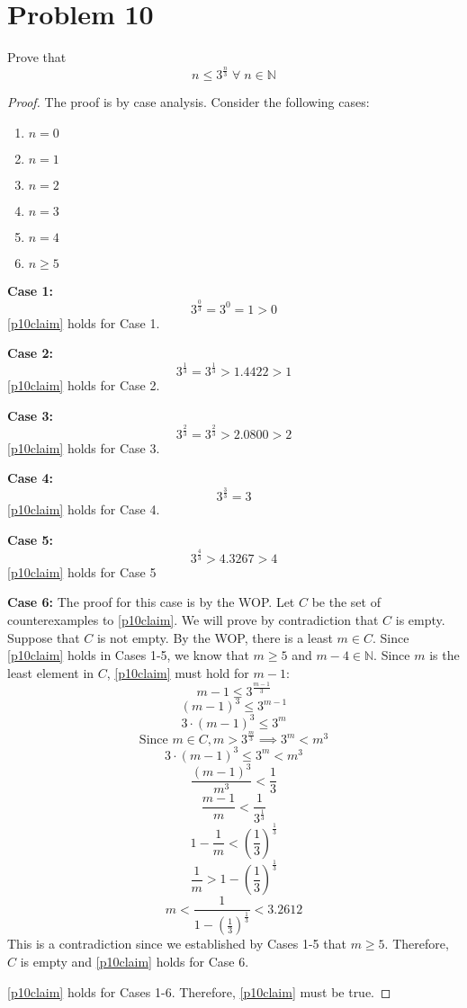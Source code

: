 \documentclass{article}
\begin{document}
\section{Problem 10}
Prove that
\begin{equation}\label{p10claim}
	n \leq 3^{\frac{n}{3}} \; \forall \; n \in \mathbb{N}
\end{equation}
\begin{proof}
	The proof is by case analysis. Consider the following cases:
	\begin{enumerate}
		\item $n = 0$
		\item $n = 1$
		\item $n = 2$
		\item $n = 3$
		\item $n = 4$
		\item $n \geq 5$
	\end{enumerate}

	\textbf{Case 1:}
	\[
		3^{\frac{0}{3}} = 3^0 = 1 > 0
	\]
	\eqref{p10claim} holds for Case 1.

	\textbf{Case 2:}
	\[
		3^{\frac{1}{3}} = 3^{\frac{1}{3}} > 1.4422 > 1
	\]
	\eqref{p10claim} holds for Case 2.

	\textbf{Case 3:}
	\[
		3^{\frac{2}{3}} = 3^{\frac{2}{3}} > 2.0800 > 2
	\]
	\eqref{p10claim} holds for Case 3.

	\textbf{Case 4:}
	\[
		3^{\frac{3}{3}} = 3
	\]
	\eqref{p10claim} holds for Case 4.

	\textbf{Case 5:}
	\[
		3^{\frac{4}{3}} > 4.3267 > 4
	\]
	\eqref{p10claim} holds for Case 5

	\textbf{Case 6:}
	The proof for this case is by the WOP. Let $C$ be the set of counterexamples to \eqref{p10claim}. We will prove by contradiction that $C$ is empty. Suppose that $C$ is not empty. By the WOP, there is a least $m \in C$. Since \eqref{p10claim} holds in Cases 1-5, we know that $m \geq 5$ and $m - 4 \in \mathbb{N}$. Since $m$ is the least element in $C$, \eqref{p10claim} must hold for $m - 1$:
	\[
		m - 1 \leq 3^{\frac{m - 1}{3}}
	\]
	\[
		(m - 1)^3 \leq 3^{m-1}
	\]
	\[
		3 \cdot (m - 1)^3 \leq 3^m
	\]
	\[
		\text{Since } m \in C, m > 3^{\frac{m}{3}} \implies 3^m < m^3
	\]
	\[
		3 \cdot (m - 1)^3 \leq 3^m < m^3
	\]
	\[
		\frac{(m - 1)^3}{m^3} < \frac{1}{3}
	\]
	\[
		\frac{m - 1}{m} < \frac{1}{3^{\frac{1}{3}}}
	\]
	\[
		1 - \frac{1}{m} < \left(\frac{1}{3}\right)^{\frac{1}{3}}
	\]
	\[
		\frac{1}{m} > 1 - \left(\frac{1}{3}\right)^{\frac{1}{3}}
	\]
	\[
		m < \frac{1}{1 - \left(\frac{1}{3}\right)^{\frac{1}{3}}} < 3.2612
	\]
	This is a contradiction since we established by Cases 1-5 that $m \ge 5$. Therefore, $C$ is empty and \eqref{p10claim} holds for Case 6.

	\eqref{p10claim} holds for Cases 1-6. Therefore, \eqref{p10claim} must be true.
\end{proof}
\end{document}
